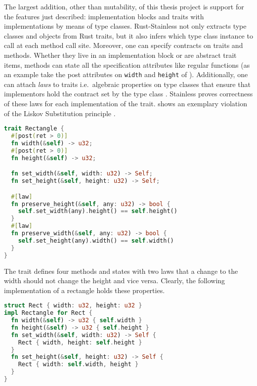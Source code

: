 The largest addition, other than mutability, of this thesis project is
support for the features just described: implementation blocks and
traits with implementations by means of type classes. Rust-Stainless not
only extracts type classes and objects from Rust traits, but it also
infers which type class instance to call at each method call site.
Moreover, one can specify contracts on traits and methods. Whether they
live in an implementation block or are abstract trait items, methods can
state all the specification attributes like regular functions (as an
example take the post attributes on \passthrough{\lstinline!width!} and
\passthrough{\lstinline!height!} of ).
Additionally, one can attach \emph{laws} to traits i.e.~algebraic
properties on type classes that ensure that implementors hold the
contract set by the type class \cite[section "Specifying Algebraic
Properties"]{stainless-doc}. Stainless proves correctness of these laws
for each implementation of the trait.  shows an
exemplary violation of the Liskov Substitution principle \cite{liskov}.

\begin{lstlisting}[language=Rust, caption={Example trait with laws.}, label={lst:liskov1}]
trait Rectangle {
  #[post(ret > 0)]
  fn width(&self) -> u32;
  #[post(ret > 0)]
  fn height(&self) -> u32;

  fn set_width(&self, width: u32) -> Self;
  fn set_height(&self, height: u32) -> Self;

  #[law]
  fn preserve_height(&self, any: u32) -> bool {
    self.set_width(any).height() == self.height()
  }
  #[law]
  fn preserve_width(&self, any: u32) -> bool {
    self.set_height(any).width() == self.width()
  }
}
\end{lstlisting}

The trait defines four methods and states with two laws that a change to
the width should not change the height and vice versa. Clearly, the
following implementation of a rectangle holds these properties.

\begin{lstlisting}[language=Rust, caption={Example implementation of the trait.}]
struct Rect { width: u32, height: u32 }
impl Rectangle for Rect {
  fn width(&self) -> u32 { self.width }
  fn height(&self) -> u32 { self.height }
  fn set_width(&self, width: u32) -> Self {
    Rect { width, height: self.height }
  }
  fn set_height(&self, height: u32) -> Self {
    Rect { width: self.width, height }
  }
}
\end{lstlisting}

